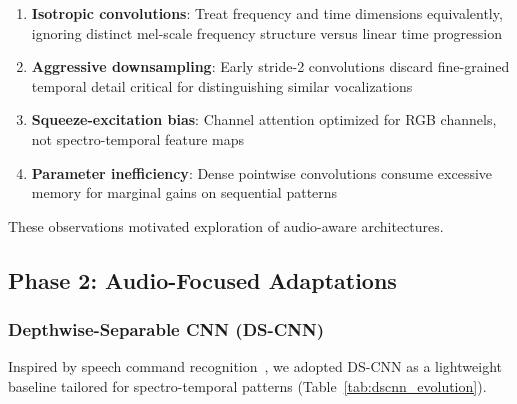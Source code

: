 \documentclass[conference]{IEEEtran}
\begin{document}
\begin{enumerate}
    \item \textbf{Isotropic convolutions}: Treat frequency and time dimensions equivalently, ignoring distinct mel-scale frequency structure versus linear time progression
    \item \textbf{Aggressive downsampling}: Early stride-2 convolutions discard fine-grained temporal detail critical for distinguishing similar vocalizations
    \item \textbf{Squeeze-excitation bias}: Channel attention optimized for RGB channels, not spectro-temporal feature maps
    \item \textbf{Parameter inefficiency}: Dense pointwise convolutions consume excessive memory for marginal gains on sequential patterns
\end{enumerate}

These observations motivated exploration of audio-aware architectures.

\subsection{Phase 2: Audio-Focused Adaptations}
\label{sec:phase2}

\subsubsection{Depthwise-Separable CNN (DS-CNN)}

Inspired by speech command recognition~\cite{zhang2017hello}, we adopted DS-CNN as a lightweight baseline tailored for spectro-temporal patterns (Table~\ref{tab:dscnn_evolution}).
\end{document}
